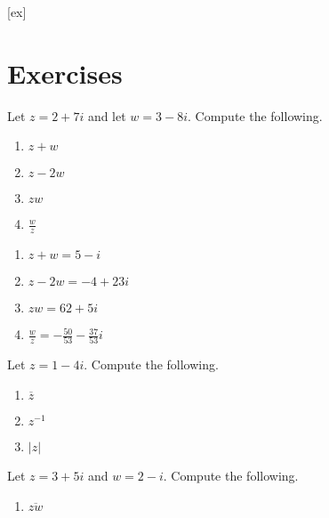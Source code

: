 [ex]
\section*{Exercises}

\begin{enumialphparenastyle}

\begin{ex} Let $z=2+7i$ and let $w=3-8i.$ Compute the following.

\begin{enumerate}
\item $z + w$

\item $z - 2w$

\item $zw$

\item $\frac{w}{z}$
\end{enumerate}
\begin{sol}
\begin{enumerate}
\item $z + w = 5-i$
\item $z - 2w = -4 + 23i$
\item $zw = 62+5i$ 
\item $\frac{w}{z} = -\frac{50}{53}-\frac{37}{53}i$
\end{enumerate}
\end{sol}
\end{ex}

\begin{ex} Let $z = 1 - 4i$. Compute the following.

\begin{enumerate}

\item $\overline{z}$

\item $z^{-1}$

\item $\left| z \right|$
\end{enumerate}
\end{ex}

\begin{ex} Let $z = 3 +5i$ and $w = 2 - i$. Compute the following.

\begin{enumerate}
\item $\overline{zw}$


\end{enumerate}
\end{ex}
\end{enumialphparenastyle}
